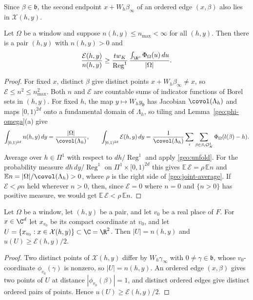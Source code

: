 Since $\beta\in\mathfrak b$, the second endpoint $x+W_h\beta_\infty$ of an
ordered edge $(x,\beta)$ also lies in $\mathcal X(h,y)$.

\begin{lemma}\label{geo:joint-average-lemma}
Let $\Omega$ be a window and suppose $n(h,y)\le n_{\max}<\infty$ for
all $(h,y)$. Then there is a pair $(h,y)$ with $n(h,y)>0$ and
\begin{equation}\label{geo:joint-average}
 \frac{\mathcal E(h,y)}{n(h,y)}\ge
 \frac{tw_K}{\operatorname{Reg}^1}\,
 \frac{\int_{\R^c}\Phi_\Omega(u)\,du}{|\Omega|}.
\end{equation}
\end{lemma}

\begin{proof}
For fixed $x$, distinct $\beta$ give distinct points
$x+W_h\beta_\infty\ne x$, so $\mathcal E\le n^2\le n_{\max}^2$. Both $n$
and $\mathcal E$ are countable sums of indicator functions of Borel sets
in $(h,y)$. For fixed $h$, the map $y\mapsto W_hy_{\mathfrak b}$ has Jacobian
$\covol(\Lambda_h)$ and maps $[0,1)^{2d}$ onto a fundamental domain of
$\Lambda_h$, so tiling and Lemma~\ref{geo:phi-omega}(a) give
\[
 \int_{[0,1)^{2d}}n(h,y)\,dy=\frac{|\Omega|}{\covol(\Lambda_h)},\qquad
 \int_{[0,1)^{2d}}\mathcal E(h,y)\,dy
 =\frac1{\covol(\Lambda_h)}\sum_{i}\sum_{\beta\in\beta_i\mathcal O_K^1}
 \Phi_\Omega(l(\beta)-h).
\]
Average over $h\in\Pi^1$ with respect to $dh/\operatorname{Reg}^1$ and
apply \eqref{geo:unfold}. For the probability measure
$dh\,dy/\operatorname{Reg}^1$ on $\Pi^1\times[0,1)^{2d}$ this gives
$\mathbb E\,\mathcal E=\rho\,\mathbb En$ and
$\mathbb En=|\Omega|/\covol(\Lambda_h)>0$, where $\rho$ is the right
side of \eqref{geo:joint-average}. If $\mathcal E<\rho n$ held wherever
$n>0$, then, since $\mathcal E=0$ where $n=0$ and $\{n>0\}$ has positive
measure, we would get $\mathbb E\,\mathcal E<\rho\,\mathbb En$.
\end{proof}

\begin{lemma}\label{geo:planar}
Let $\Omega$ be a window, let $(h,y)$ be a pair, and let $v_0$ be a real
place of $F$. For $x\in\C^d$ let $x_{v_0}$ be its compact coordinate at
$v_0$, and let $U=\{x_{v_0}:x\in\mathcal X(h,y)\}\subset\C=\R^2$. Then
$|U|=n(h,y)$ and $u(U)\ge\mathcal E(h,y)/2$.
\end{lemma}

\begin{proof}
Two distinct points of $\mathcal X(h,y)$ differ by $W_h\gamma_\infty$
with $0\ne\gamma\in\mathfrak b$, whose $v_0$-coordinate $\phi_{v_0}(\gamma)$ is
nonzero, so $|U|=n(h,y)$. An ordered edge $(x,\beta)$ gives two points of
$U$ at distance $|\phi_{v_0}(\beta)|=1$, and distinct ordered edges give
distinct ordered pairs of points. Hence $u(U)\ge\mathcal E(h,y)/2$.
\end{proof}


